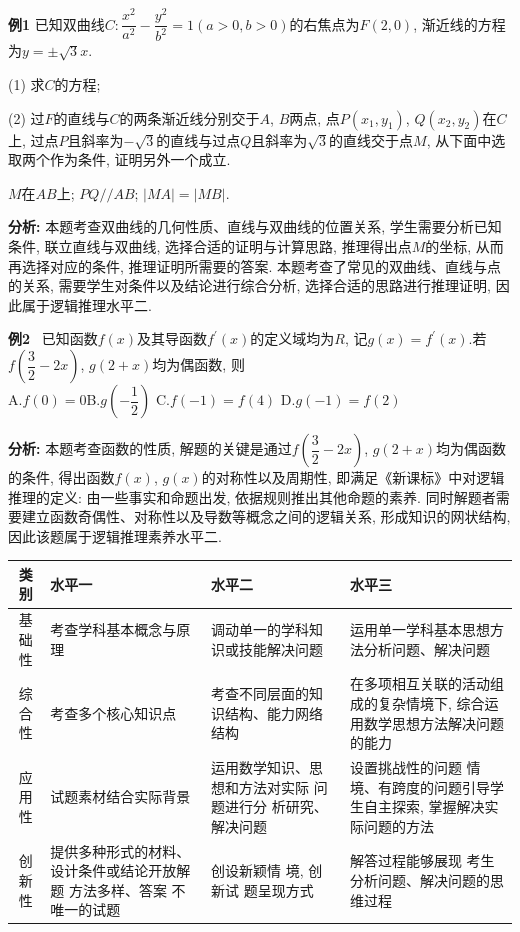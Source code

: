 \documentclass[acaddeg]{Style/SCNUThesisV3}
\begin{document}
 

\textbf{例1}	 已知双曲线$C: \dfrac{{{x}^{2}}}{{{a}^{2}}}-\dfrac{{{y}^{2}}}{{{b}^{2}}}=1\left( a>0, b>0 \right) $的右焦点为$F (2, 0) $, 渐近线的方程为$y=\pm \sqrt{3}x$. 

(1) 求$C$的方程; 

(2) 过$F$的直线与$C$的两条渐近线分别交于$A$, $B$两点, 点$P ({{x}_{1}}, {{y}_{1}})$, $Q\left( {{x}_{2}}, {{y}_{2}} \right) $在$C$上,  过点$P$且斜率为$-\sqrt{3}$的直线与过点$Q$且斜率为$\sqrt{3}$的直线交于点$M$, 从下面中选取两个作为条件, 证明另外一个成立. 

$M$在$AB$上; $PQ//AB$; $\left| MA \right|=\left| MB \right|$.

\textbf{分析: }本题考查双曲线的几何性质、直线与双曲线的位置关系, 学生需要分析已知条件, 联立直线与双曲线, 选择合适的证明与计算思路, 推理得出点$M$的坐标, 从而再选择对应的条件, 推理证明所需要的答案. 本题考查了常见的双曲线、直线与点的关系, 需要学生对条件以及结论进行综合分析, 选择合适的思路进行推理证明, 因此属于逻辑推理水平二. 

\textbf{例2} \ 已知函数$f(x) $及其导函数${{f}^{'}}(x) $的定义域均为$R$, 记$g(x) ={{f}^{'}}(x) $.若$f(\dfrac{3}{2}-2x) $, $g(2+x) $均为偶函数, 则\\
A.$f(0) =0$\qquad  \qquad \quad B.$g(-\dfrac{1}{2}) $  \quad  \quad \qquad C.$f(-1) =f(4) $ \quad  \quad \qquad D.$g(-1) =f(2) $

\textbf{分析: }本题考查函数的性质, 解题的关键是通过$f(\dfrac{3}{2}-2x) $, $g(2+x) $均为偶函数的条件, 得出函数$f(x) $, $g(x) $的对称性以及周期性, 即满足《新课标》中对逻辑推理的定义: 由一些事实和命题出发, 依据规则推出其他命题的素养. 同时解题者需要建立函数奇偶性、对称性以及导数等概念之间的逻辑关系, 形成知识的网状结构, 因此该题属于逻辑推理素养水平二.

\begin{table}  
	\begin{tabular}{c|p{4cm}p{4cm}p{4cm}}
		\toprule
		\rule{0pt}{18pt}
		类别  & 水平一 & 水平二& 水平三 \\
		\midrule
		\rule{0pt}{20pt}
		基础性&考查学科基本概念与原理& 调动单一的学科知识或技能解决问题& 运用单一学科基本思想方法分析问题、解决问题\\
		\rule{0pt}{20pt}
		综合性 & 考查多个核心知识点&考查不同层面的知识结构、能力网络结构 &在多项相互关联的活动组成的复杂情境下, 综合运用数学思想方法解决问题的能力\\
		\rule{0pt}{20pt}
		应用性 & 试题素材结合实际背景&  运用数学知识、思想和方法对实际	问题进行分	析研究、解决问题&设置挑战性的问题	情境、有跨度的问题引导学生自主探索, 掌握解决实际问题的方法\\
		\rule{0pt}{20pt}
		创新性 & 提供多种形式的材料、设计条件或结论开放解题	方法多样、答案	不唯一的试题& 创设新颖情	境, 创新试	题呈现方式&解答过程能够展现	考生分析问题、解决问题的思维过程\\
		\bottomrule
	\end{tabular} 
	\label{table:3.11}
\end{table} \cite{xu}
\end{document}
